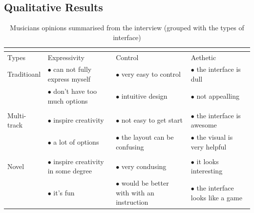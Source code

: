 \subsection{Qualitative Results}

\begin{table}[h]
  \centering
  \begin{tabular}{ |p{2cm}|p{3.2cm}|p{3.2cm}|p{3.2cm}|}
   \multicolumn{4}{l}{} \\
   \hline
   Types & Expressivity  & Control  & Aethetic \\
   \hline
   Traditioanl & $\bullet$ can not fully express myself & $\bullet$ very easy to control & $\bullet$ the interface is dull\\
   & $\bullet$ don't have too much options &  $\bullet$ intuitive design & $\bullet$ not appealling\\
   & & &\\
   \hline
   Multi-track  & $\bullet$ inspire creativity & $\bullet$ not easy to get start & $\bullet$ the interface is awesome\\
   & $\bullet$ a lot of options& $\bullet$ the layout can be confusing & $\bullet$ the visual  is very helpful\\
   & & &\\
   \hline
   Novel & $\bullet$ inspire creativity in some degree & $\bullet$ very condusing & $\bullet$ it looks interesting\\
   & $\bullet$ it's fun & $\bullet$ would be better with with an instruction & $\bullet$ the interface looks like a game\\

   \hline
  \end{tabular}
  \caption[l]{ Musicians opinions summarised from the interview (grouped with the types of interface)}
  \label{tab: suduko}
\end{table}

\bigskip


